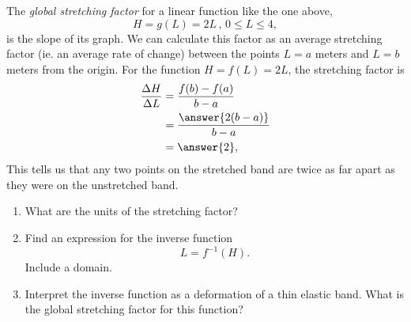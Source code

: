\documentclass{ximera}
\begin{document}
The \emph{global stretching factor} for a linear function like the one above, %
\[
      H = g(L) = 2L \, , \, 0\leq L \leq 4 ,
\]
is the slope of its graph. We can calculate this factor as an average stretching factor (ie. an average rate of change) between the points $L=a$  meters and $L=b$ meters from the origin. For the function $H=f(L) = 2L$, the stretching factor is
\begin{align*}
  \frac{\Delta H}{\Delta L} &= \frac{f(b) - f(a)}{b-a} \\
                                       &= \frac{\answer{2(b-a)}}{b-a} \\
                                       &= \answer{2},
\end{align*}
This tells us that any two points on the stretched band are twice as far apart as they were on the unstretched band.

\begin{question}  \label{Q:LDJJNMDesd}
\begin{enumerate}
\item What are the units of the stretching factor?
\begin{freeResponse}
\end{freeResponse}

\item Find an expression for the inverse function
\[
      L = f^{-1}(H).
\]
Include a domain. 

\item Interpret the inverse function as a deformation of a thin elastic band. What is the global stretching factor for this function?
\begin{freeResponse}
\end{freeResponse}
\end{enumerate}
\end{question}
\end{document}

